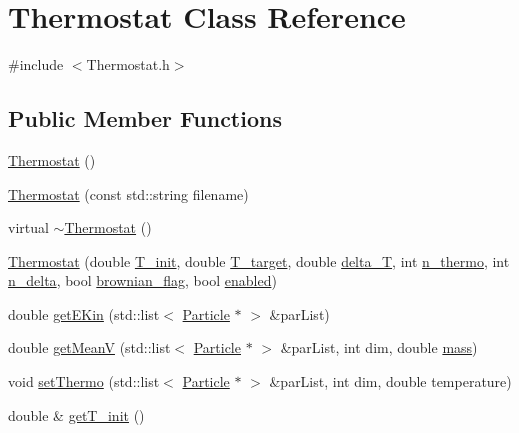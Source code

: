 \hypertarget{classThermostat}{\section{Thermostat Class Reference}
\label{classThermostat}
}


{\ttfamily \#include $<$Thermostat.\-h$>$}

\subsection*{Public Member Functions}
\begin{DoxyCompactItemize}
\item 
\hyperlink{classThermostat_a67cfc54f1cff43f4cd92c58e3be01919}{Thermostat} ()
\item 
\hyperlink{classThermostat_a363b4ca8da84980f9f8765acdc07e80d}{Thermostat} (const std\-::string filename)
\item 
virtual \hyperlink{classThermostat_a287977ba29071ae8c927d68e556c3098}{$\sim$\-Thermostat} ()
\item 
\hyperlink{classThermostat_a2151c3d615d12cd4f4d54a4e4f857142}{Thermostat} (double \hyperlink{classThermostat_a663a14e3a4b7bf439c92fbcd0ebac7a3}{T\-\_\-init}, double \hyperlink{classThermostat_a63c42ca7dee6ed5237d8be9e9c3f1228}{T\-\_\-target}, double \hyperlink{classThermostat_a1628e1ae6669caacbb02da75423cc35c}{delta\-\_\-\-T}, int \hyperlink{classThermostat_a25a5e29fbae46ffb4152655b3ba062cf}{n\-\_\-thermo}, int \hyperlink{classThermostat_a9a2715e81ed11171e530e2d22a682244}{n\-\_\-delta}, bool \hyperlink{classThermostat_a86ae25ddde5ab2ecd7d70a50c8a72823}{brownian\-\_\-flag}, bool \hyperlink{classThermostat_ae383f11c6ba111f1f14b470a17655d04}{enabled})
\item 
double \hyperlink{classThermostat_aa9f9d0b9ca412ff73124a8fef0882740}{get\-E\-Kin} (std\-::list$<$ \hyperlink{classParticle}{Particle} $\ast$ $>$ \&par\-List)
\item 
double \hyperlink{classThermostat_aa0e58f2c8b189f31c949d9cd1870aa6f}{get\-Mean\-V} (std\-::list$<$ \hyperlink{classParticle}{Particle} $\ast$ $>$ \&par\-List, int dim, double \hyperlink{MolSim_8cpp_aba71f400e3a017e824e2a70435a75542}{mass})
\item 
void \hyperlink{classThermostat_a2a3f40b013805848e2092d8e2579e100}{set\-Thermo} (std\-::list$<$ \hyperlink{classParticle}{Particle} $\ast$ $>$ \&par\-List, int dim, double temperature)
\item 
double \& \hyperlink{classThermostat_a7f5f9fb551b0a5f3dd183cd4f0cec3fa}{get\-T\-\_\-init} ()

\end{DoxyCompactItemize}

